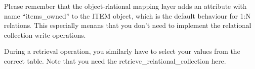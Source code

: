 Please remember that the object-rlational mapping layer adds an attribute with name ``items\_owned'' to the ITEM object, which is the default behaviour for 1:N relations.
This especially menans that you don't need to implement the relational collection write operations.

During a retrieval operation, you similarly have to select your values from the correct table.
Note that you need the retrieve\_relational\_collection here.













